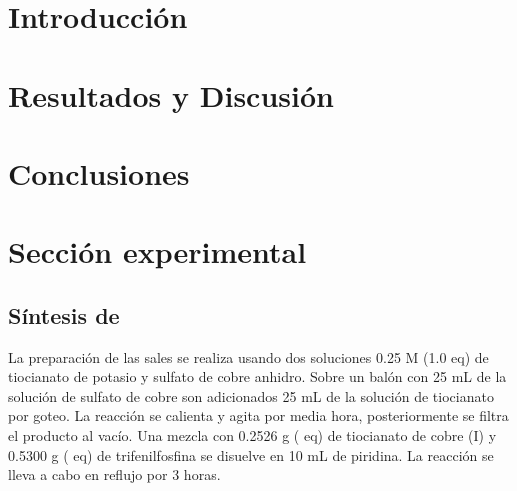 \documentclass[fleqn,10pt]{SelfArx}
\begin{document}
\flushbottom %

\maketitle %


\thispagestyle{empty} %




\section*{Introducci\'on} %


\section{Resultados y Discusi\'on}

\section{Conclusiones}

\section{Secci\'on experimental}
\subsection{S\'intesis de }
La preparaci\'on de las sales se realiza usando dos soluciones 0.25 M (1.0 eq) de tiocianato de potasio y sulfato de cobre anhidro. Sobre un bal\'on con 25 mL de la soluci\'on de sulfato de cobre son adicionados 25 mL de la soluci\'on de tiocianato por goteo. La reacci\'on se calienta y agita por media hora, posteriormente se filtra el producto al vac\'io. Una mezcla con 0.2526 g ( eq) de tiocianato de cobre (I) y 0.5300 g ( eq) de trifenilfosfina se disuelve en 10 mL de piridina. La reacci\'on se lleva a cabo en reflujo por 3 horas.
\end{document}
